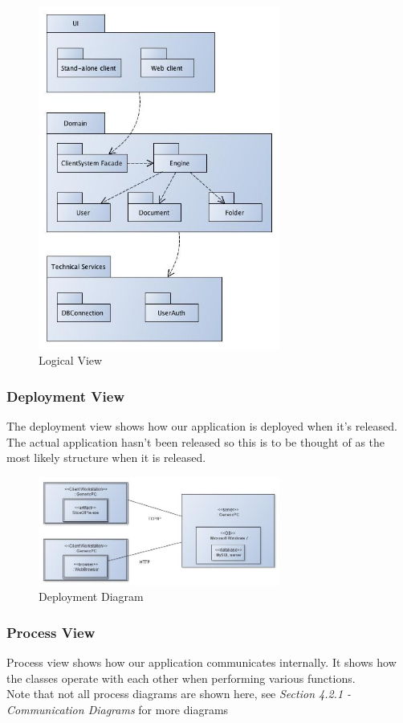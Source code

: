 \documentclass[11pt]{article}
\begin{document}
\begin{figure}[H]
  		\centering
    	\includegraphics[width=300px]{images/SAD/LogicalView_UML.jpg}
    	\caption{Logical View}
\end{figure}

\subsubsection{Deployment View}
\label{sec-4-1-5}
The deployment view shows how our application is deployed when it's released. The actual application hasn't been released so this is to be thought of as the most likely structure when it is released.

\begin{figure}[H]
  		\centering
    	\includegraphics[width=300px]{images/Deployment Diagram.jpg}
    	\caption{Deployment Diagram}
\end{figure}
\subsubsection{Process View}
\label{sec-4-1-6}
Process view shows how our application communicates internally. It shows how the classes operate with each other when performing various functions. \\
Note that not all process diagrams are shown here, see \emph{Section 4.2.1 - Communication Diagrams} for more diagrams
\end{document}
